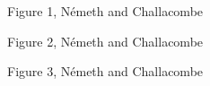 \documentclass[prl,twocolumn,showpacs,twocolumngrid,superbib]{revtex4}
\begin{document}
{\begin{center}
Figure 1, N{\'e}meth and Challacombe \\[1.cm]
\end{center}

\clearpage

\begin{center}
Figure 2, N{\'e}meth and Challacombe \\[1.cm]
\end{center}

\clearpage

\begin{center}
Figure 3, N{\'e}meth and Challacombe \\[1.cm]
\end{center}

}
\end{document}
